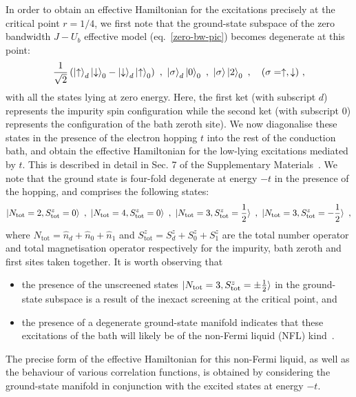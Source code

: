 \documentclass{iopart}
\begin{document}
In order to obtain an effective Hamiltonian for the excitations precisely at the critical point \(r=1/4\), we first note that the ground-state subspace of the zero bandwidth $J-U_{b}$ effective model (eq.~\eqref{zero-bw-pic}) becomes degenerate at this point:
\begin{eqnarray}
\frac{1}{\sqrt 2}\left(\ket{\uparrow}_d\ket{\downarrow}_0 - \ket{\downarrow}_d\ket{\uparrow}_0\right)~,~ \ket{\sigma}_d\ket{0}_0~,~\ket{\sigma}\ket{2}_0~,~~~ (\sigma=\uparrow,\downarrow)~,
\end{eqnarray}
with all the states lying at zero energy. Here, the first ket (with subscript \(d\)) represents the impurity spin configuration while the second ket (with subscript \(0\)) represents the configuration of the bath zeroth site). We now diagonalise these states in the presence of the electron hopping \(t\) into the rest of the conduction bath, and obtain the effective Hamiltonian for the low-lying excitations mediated by \(t\). This is described in detail in Sec. 7 of the Supplementary Materials~\cite{supp_mat}. We note that the ground state is four-fold degenerate at energy \(-t\) in the presence of the hopping, and comprises the following states:
\begin{eqnarray}
	\label{degenerate-nfl}
	\ket{N_\text{tot}=2,S^z_\text{tot}=0}~,~\ket{N_\text{tot}=4,S^z_\text{tot}=0}~, ~\ket{N_\text{tot}=3,S^z_\text{tot}=\frac{1}{2}}~,~\ket{N_\text{tot}=3,S^z_\text{tot}=-\frac{1}{2}}~,
\end{eqnarray}
where \(N_\text{tot} = \hat n_d + \hat n_0 + \hat n_1\) and \(S^z_\text{tot} = S^z_d + S^z_0 + S^z_1\) are the total number operator and total magnetisation operator respectively for the impurity, bath zeroth and first sites taken together. It is worth observing that
\begin{itemize}
	\item the presence of the unscreened states \(\ket{N_\text{tot}=3,S^z_\text{tot}=\pm\frac{1}{2}}\) in the ground-state subspace is a result of the inexact screening at the critical point, and
	\item the presence of a degenerate ground-state manifold indicates that these excitations of the bath will likely be of the non-Fermi liquid (NFL) kind~\cite{varma2002singular,si_kotliar_1993,Kotliar_1993}.
\end{itemize}
The precise form of the effective Hamiltonian for this non-Fermi liquid, as well as the behaviour of various correlation functions, is obtained by considering the ground-state manifold in conjunction with the excited states at energy \(-t\). 
\end{document}
